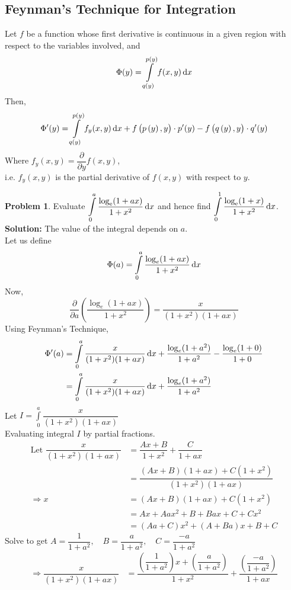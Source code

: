 \documentclass[14]{article}
\theoremstyle{definition}
\newtheorem{prob}{Problem}
\theoremstyle{case}
\begin{document}
\subsection{Feynman's Technique for Integration}
Let $f$ be a function whose first derivative is continuous in a given region with respect to the variables involved, and
\[\Phi(y) = \int\limits_{q(y)}^{p(y)} f(x,y) \dif x\]
Then,
\[\Phi'(y) = \int\limits_{q(y)}^{p(y)} f_y(x, y) \dif x + f\left(p\left( y\right), y\right) \cdot p'(y) - f\left(q\left(y\right), y \right) \cdot q'(y)\]
Where $f_y(x, y) = \dfrac{\partial}{\partial y} f(x, y)$,\\ i.e. $f_y(x, y)$ is the partial derivative of $f(x, y)$ with respect to $y$.
\begin{prob}
Evaluate $\displaystyle\int\limits_0^a \dfrac{\log_{\rm e}(1+ax)}{1+x^2} \dif x$ and hence find $\displaystyle\int\limits_0^1 \dfrac{\log_{\rm e}(1+x)}{1+x^2} \dif x$.\\
\textbf{Solution:} The value of the integral depends on $a$.\\
Let us define
\[\Phi(a) = \int\limits_0^a \dfrac{\log_e(1+ax)}{1+x^2} \dif x\]
Now, \[\dfrac{\partial}{\partial a} \left(\dfrac{\log_e(1+ax)}{1+x^2}\right) = \dfrac{x}{(1+x^2)(1+ax)}\]
Using Feynman's Technique,
\begin{align*}
\Phi'(a) &= \int\limits_0^a \dfrac{x}{(1+x^2)(1+ax)} \dif x + \dfrac{\log_e(1+a^2)}{1+a^2} - \dfrac{\log_e(1 + 0)}{1+0}\\
&= \int\limits_0^a \dfrac{x}{(1+x^2)(1+ax)} \dif x + \dfrac{\log_e(1+a^2)}{1+a^2}\\
\end{align*}
Let $I = \displaystyle\int\limits_0^a \dfrac{x}{(1+x^2)(1+ax)}$\\
Evaluating integral $I$ by partial fractions.\\
\begin{align*}
\text{Let } \dfrac{x}{(1+x^2)(1+ax)} &= \dfrac{Ax+B}{1+x^2} + \dfrac{C}{1+ax}\\
&= \dfrac{(Ax+B)(1+ax) + C(1+x^2)}{(1+x^2)(1+ax)}\\
\Rightarrow x &= (Ax + B)(1+ ax) + C(1+x^2)\\
&= Ax + Aax^2 + B + Bax + C + Cx^2\\
&= (Aa + C) x^2 + (A + Ba)x + B + C
\end{align*}
Solve to get $A = \dfrac{1}{1+a^2},\quad B = \dfrac{a}{1+a^2}, \quad C = \dfrac{-a}{1+a^2}$
\pagebreak
\begin{align*}
\Rightarrow \dfrac{x}{(1+x^2)(1+ax)} &= \dfrac{\left( \dfrac{1}{1+a^2} \right)x + \left( \dfrac{a}{1+a^2} \right)}{1+x^2} + \dfrac{\left( \dfrac{-a}{1+a^2} \right)}{1+ax}\\

\end{align*}
\end{prob}
\end{document}
